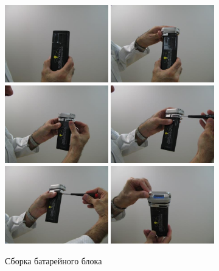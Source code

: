\begin{figure}[h]
  \centering
  \includegraphics[width=0.4\textwidth]{figures/assembling_the_battery_packs_1}
  \includegraphics[width=0.4\textwidth]{figures/assembling_the_battery_packs_2}
  \includegraphics[width=0.4\textwidth]{figures/assembling_the_battery_packs_3}
  \includegraphics[width=0.4\textwidth]{figures/assembling_the_battery_packs_4}
  \includegraphics[width=0.4\textwidth]{figures/assembling_the_battery_packs_5}
  \includegraphics[width=0.4\textwidth]{figures/assembling_the_battery_packs_6}
  \caption{Сборка батарейного блока}
  \label{fig:assembling_the_battery_packs}
\end{figure}

